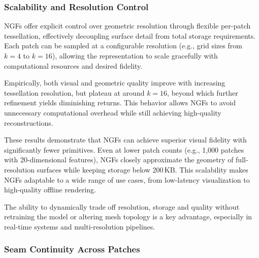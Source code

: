 \subsubsection{Scalability and Resolution Control}

NGFs offer explicit control over geometric resolution through flexible per-patch tessellation, effectively decoupling surface detail from total storage requirements. 
Each patch can be sampled at a configurable resolution (e.g., grid sizes from $k=4$ to $k=16$), allowing the representation to scale gracefully with computational resources and desired fidelity. 

Empirically, both visual and geometric quality improve with increasing tessellation resolution, but plateau at around $k=16$, beyond which further refinement yields diminishing returns. 
This behavior allows NGFs to avoid unnecessary computational overhead while still achieving high-quality reconstructions. 

\begin{table}[h]
\centering
{}
\caption{Storage vs. Visual Quality (Ganesha Model)}
\end{table}

These results demonstrate that NGFs can achieve superior visual fidelity with significantly fewer primitives. 
Even at lower patch counts (e.g., 1,000 patches with 20-dimensional features), NGFs closely approximate the geometry of full-resolution surfaces while keeping storage below 200\,KB. 
This scalability makes NGFs adaptable to a wide range of use cases, from low-latency visualization to high-quality offline rendering. 

The ability to dynamically trade off resolution, storage and quality without retraining the model or altering mesh topology is a key advantage, especially in real-time systems and multi-resolution pipelines. 

\subsubsection{Seam Continuity Across Patches}

